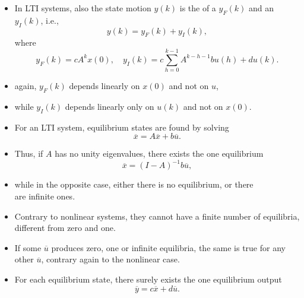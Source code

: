 \begin{frame}
\framesubtitleTC{}
\myPause
\begin{itemize}[<+-| alert@+>]
\item In LTI systems, also the state motion $y(k)$ is the  of a  $y_F(k)$ and an
       $y_I(k)$, i.e.,
      \begin{displaymath}
       y(k) = y_F(k) + y_I(k),
      \end{displaymath} \myPause
      where
      \begin{displaymath}
       y_F(k) = cA^k x(0), \quad
       y_I(k) = c\sum\limits_{h=0}^{k-1} A^{k-h-1}bu(h) +du(k).
      \end{displaymath} \myPause
\item again, $y_F(k)$ depends linearly on $x(0)$ and not on $u$,
\item while $y_I(k)$ depends linearly only on $u(k)$ and not on $x(0)$.
\end{itemize}
\end{frame}

\begin{frame}
\framesubtitleTC{}
\myPause
\begin{itemize}[<+-| alert@+>]
\item For an LTI system, equilibrium states are found by solving
      \begin{displaymath}
       \overline{x} = A\overline{x}+b\overline{u}.
      \end{displaymath}
\item Thus, if $A$ has no unity eigenvalues, there exists the one equilibrium
      \begin{displaymath}
       \overline{x} = (I-A)^{-1}b\overline{u},
      \end{displaymath}
\item while in the opposite case, either there is no equilibrium, or there\\
      are infinite ones.
\end{itemize}
\end{frame}

\begin{frame}
\myPause
\begin{itemize}[<+-| alert@+>]
\item Contrary to nonlinear systems, they cannot have a finite number of equilibria, different from zero and one.
\item If some $\overline{u}$ produces zero, one or infinite equilibria, the same is true for any other $\overline{u}$,
      contrary again to the nonlinear case.
\item For each equilibrium state, there surely exists the one equilibrium output
      \begin{displaymath}
       \overline{y}=c\overline{x}+d\overline{u}.
      \end{displaymath}
\end{itemize}
\end{frame}

